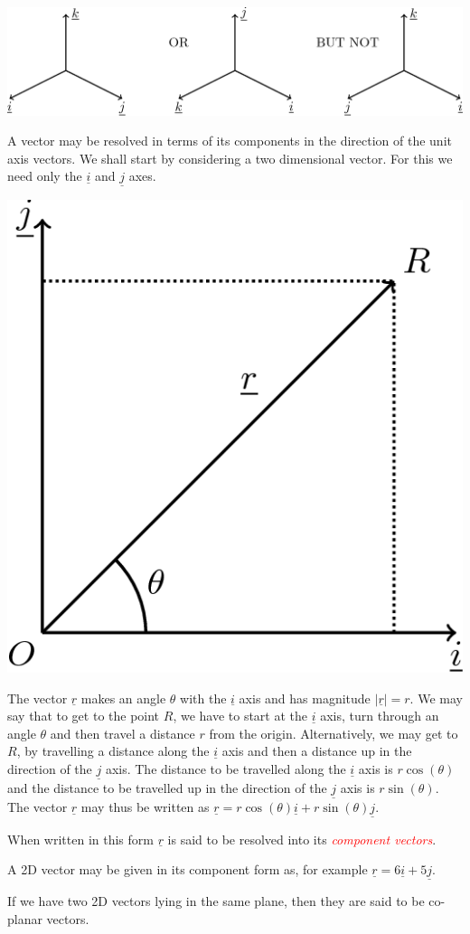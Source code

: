 \documentclass[
  11pt,
  oneside]{book}
\newcommand{\slide}{}
\theoremstyle{definition}
\theoremstyle{definition}
\theoremstyle{definition}
\theoremstyle{definition}
\theoremstyle{remark}
\begin{document}
\begin{center}\includegraphics[width=0.8\linewidth]{tikztopng-figure56} \end{center}

A vector may be resolved in terms of its components in the direction of the unit axis vectors. We shall start by considering a two dimensional vector. For this we need only the \(\underline i\) and \(\underline j\) axes.

\begin{center}\includegraphics[width=0.25\linewidth]{tikztopng-figure57} \end{center}

The vector \(\underline r\) makes an angle \(\theta\) with the \(\underline i\) axis and has magnitude \(|\underline r| = r\). We may say that to get to the point \(R\), we have to start at the \(\underline i\) axis, turn through an angle \(\theta\) and then travel a distance \(r\) from the origin. Alternatively, we may get to \(R\), by travelling a distance along the \(\underline i\) axis and then a distance up in the direction of the \(\underline j\) axis. The distance to be travelled along the \(\underline i\) axis is \(r\cos(\theta)\) and the distance to be travelled up in the direction of the \(\underline j\) axis is \(r\sin(\theta)\). The vector \(\underline r\) may thus be written as \(\underline r = r\cos(\theta) \underline i + r\sin(\theta)\underline j\).

When written in this form \(\underline r\) is said to be resolved into its \textcolor{red}{\em component vectors}.

\slide

A 2D vector may be given in its component form as, for example \(\underline r = 6\underline i + 5\underline j\).

If we have two 2D vectors lying in the same plane, then they are said to be co-planar vectors.
\end{document}
